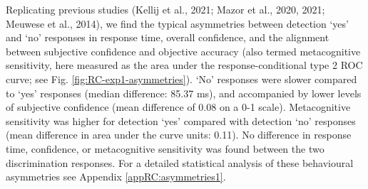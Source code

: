 \documentclass[12pt,twoside]{reedthesis}
\begin{document}
Replicating previous studies (Kellij et al., 2021; Mazor et al., 2020, 2021; Meuwese et al., 2014), we find the typical asymmetries between detection `yes' and `no' responses in response time, overall confidence, and the alignment between subjective confidence and objective accuracy (also termed metacognitive sensitivity, here measured as the area under the response-conditional type 2 ROC curve; see Fig. \ref{fig:RC-exp1-asymmetries}). `No' responses were slower compared to `yes' responses (median difference: 85.37 ms), and accompanied by lower levels of subjective confidence (mean difference of 0.08 on a 0-1 scale). Metacognitive sensitivity was higher for detection `yes' compared with detection `no' responses (mean difference in area under the curve units: 0.11). No difference in response time, confidence, or metacognitive sensitivity was found between the two discrimination responses. For a detailed statistical analysis of these behavioural asymmetries see Appendix \ref{appRC:asymmetries1}.
\end{document}
